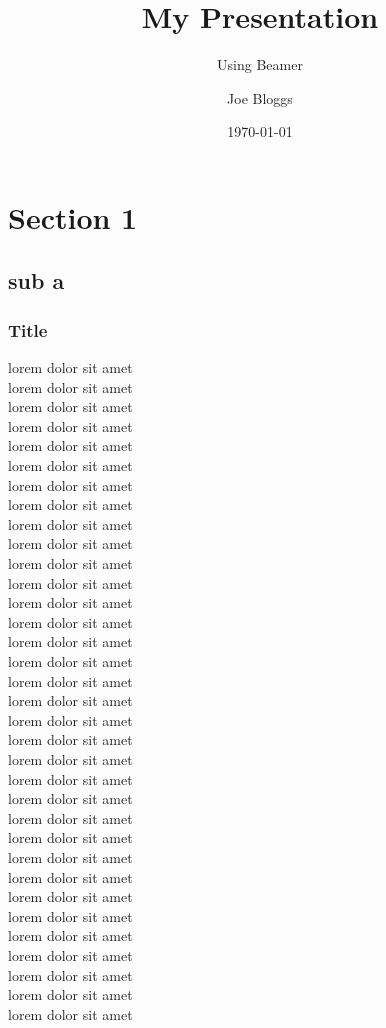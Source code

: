 \documentclass{beamer}
\title{My Presentation}
\subtitle{Using Beamer}
\author{Joe Bloggs}
\institute{University of ShareLaTeX}
\date{\today}
\begin{document}
\begin{frame}
\titlepage
\end{frame}

\section{Section 1}
\subsection{sub a}

\begin{frame}
    \frametitle{Title}
    lorem dolor sit amet \\
    lorem dolor sit amet \\
    lorem dolor sit amet \\
    lorem dolor sit amet \\
    lorem dolor sit amet \\
    lorem dolor sit amet \\
    lorem dolor sit amet \\
    lorem dolor sit amet \\
    lorem dolor sit amet \\
    lorem dolor sit amet \\
    lorem dolor sit amet \\
    lorem dolor sit amet \\
    lorem dolor sit amet \\
    lorem dolor sit amet \\
    lorem dolor sit amet \\
    lorem dolor sit amet \\
    lorem dolor sit amet \\
    lorem dolor sit amet \\
    lorem dolor sit amet \\
    lorem dolor sit amet \\
    lorem dolor sit amet \\
    lorem dolor sit amet \\
    lorem dolor sit amet \\
    lorem dolor sit amet \\
    lorem dolor sit amet \\
    lorem dolor sit amet \\
    lorem dolor sit amet \\
    lorem dolor sit amet \\
    lorem dolor sit amet \\
    lorem dolor sit amet \\
    lorem dolor sit amet \\
    lorem dolor sit amet \\
    lorem dolor sit amet \\
    lorem dolor sit amet \\
\end{frame}
\end{document}
